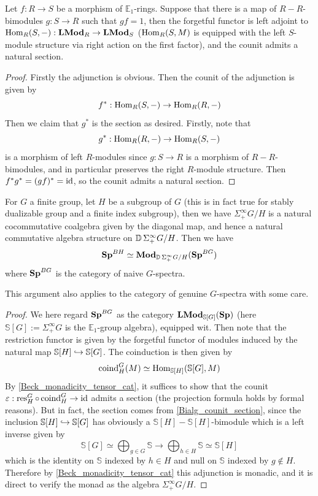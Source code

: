 	\begin{lemma}\label{Bialg_counit_section}
		Let $f:R\to S$ be a morphism of $\mathbb{E}_1$-rings. Suppose that there is a map of $R-R$-bimodules $g:S\to R$ such that $gf=1$, then the forgetful functor is left adjoint to $\operatorname{\mathrm{Hom}}_R(S,-):\mathbf{LMod}_R\to\mathbf{LMod}_S$ ($\operatorname{\mathrm{Hom}}_R(S,M)$ is equipped with the left $S$-module structure via right action on the first factor), and the counit admits a natural section. 
	\end{lemma}
	\begin{proof}
		Firstly the adjunction is obvious. Then the counit of the adjunction is given by 
		\[ f^*:\operatorname{\mathrm{Hom}}_R(S,-)\to\operatorname{\mathrm{Hom}}_R(R,-) \]
		Then we claim that $g^*$ is the section as desired. Firstly, note that 
		\[ g^*:\operatorname{\mathrm{Hom}}_R(R,-)\to\operatorname{\mathrm{Hom}}_R(S,-) \]
		is a morphism of left $R$-modules since $g:S\to R$ is a morphism of $R-R$-bimodules, and in particular preserves the right $R$-module structure. Then $f^*g^*=(gf)^*=\operatorname{\mathrm{id}}$, so the counit admits a natural section. 
	\end{proof}

	\begin{thm}\label{Equivariant_subgrp_module_cat}
		For $G$ a finite group, let $H$ be a subgroup of $G$ (this is in fact true for stably dualizable group and a finite index subgroup), then we have $\Sigma^\infty_+G/H$ is a natural cocommutative coalgebra given by the diagonal map, and hence a natural commutative algebra structure on $\operatorname{\mathbb{D}}\Sigma^\infty_+G/H$. Then we have 
		\[ \mathbf{Sp}^{BH}\simeq\mathbf{Mod}_{\operatorname{\mathbb{D}}\Sigma^\infty_+G/H}(\mathbf{Sp}^{BG}) \]
		where $\mathbf{Sp}^{BG}$ is the category of naive $G$-spectra.  
	\end{thm}
	\begin{remark}
		This argument also applies to the category of genuine $G$-spectra with some care. 
	\end{remark}
	\begin{proof}
		We here regard $\mathbf{Sp}^{BG}$ as the category $\mathbf{LMod}_{\mathbb{S}[G]}(\mathbf{Sp})$ (here $\mathbb{S}[G]:=\Sigma^\infty_+G$ is the $\mathbb{E}_1$-group algebra), equipped wit. Then note that the restriction functor is given by the forgetful functor of modules induced by the natural map $\mathbb{S}[H]\hookrightarrow\mathbb{S}[G]$. The coinduction is then given by 
		\[ \operatorname{\mathrm{coind}}_H^G(M)\simeq\operatorname{\mathrm{Hom}}_{\mathbb{S}[H]}(\mathbb{S}[G],M) \]
		By \cref{Beck_monadicity_tensor_cat}, it suffices to show that the counit $\varepsilon:\operatorname{\mathrm{res}}_H^G\circ\operatorname{\mathrm{coind}}_H^G\to\operatorname{\mathrm{id}}$ admits a section (the projection formula holds by formal reasons). But in fact, the section comes from \cref{Bialg_counit_section}, since the inclusion $\mathbb{S}[H]\hookrightarrow\mathbb{S}[G]$ has obviously a $\mathbb{S}[H]-\mathbb{S}[H]$-bimodule which is a left inverse given by 
		\[ \mathbb{S}[G]\simeq\bigoplus_{g\in G}\mathbb{S}\to\bigoplus_{h\in H}\mathbb{S}\simeq\mathbb{S}[H] \]
		which is the identity on $\mathbb{S}$ indexed by $h\in H$ and null on $\mathbb{S}$ indexed by $g\notin H$. Therefore by \cref{Beck_monadicity_tensor_cat} this adjunction is monadic, and it is direct to verify the monad as the algebra $\Sigma^\infty_+G/H$. 
	\end{proof}

